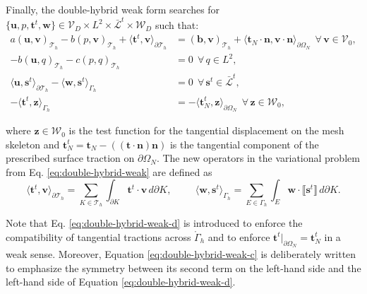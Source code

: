 \documentclass[english,11pt,3p,number,sort&compress]{elsarticle}
\newcommand{\jump}[1]
{
	\llbracket #1 \rrbracket
}
\begin{document}
Finally, the double-hybrid weak form searches for $\{\bm{u},p,\bm{t}^t,\bm{w}\} \in \mathcal{V}_D \times L^2 \times \bar{\mathcal{L}}^t \times \mathcal{W}_D$ such that:
\begin{subequations} \label{eq:double-hybrid-weak}
	\begin{align}
		a\left(\bm{u},\bm{v}\right)_{\mathcal{T}_h} - b\left( p, \bm{v}\right)_{\mathcal{T}_h} +\langle\bm{t}^t,\bm{v}\rangle_{\partial\mathcal{T}_h} &= \left(\bm{b},\bm{v}\right)_{\mathcal{T}_h} + \langle\bm{t}_N\cdot\bm{n},\bm{v}\cdot\bm{n}\rangle_{\partial\Omega_N} ~~\forall\, \bm{v} \in \mathcal{V}_0,\label{eq:double-hybrid-weak-a}\\ 
		-b\left(\bm{u}, q\right)_{\mathcal{T}_h} - c\left(p,q \right)_{\mathcal{T}_h} &= 0 ~~\forall\, q \in L^2, \label{eq:double-hybrid-weak-b}\\
		\langle\bm{u},\bm{s}^t\rangle_{\partial\mathcal{T}_h} - \langle\bm{w},\bm{s}^t\rangle_{\Gamma_h} &= 0 ~~\forall\, \bm{s}^t \in \bar{\mathcal{L}}^t, \label{eq:double-hybrid-weak-c}\\
		-\langle\bm{t}^t,\bm{z}\rangle_{\Gamma_h} &= -\langle\bm{t}_N^t,\bm{z}\rangle_{\partial\Omega_N} ~~\forall\, \bm{z} \in \mathcal{W}_0, \label{eq:double-hybrid-weak-d}
	\end{align}
\end{subequations}

\noindent where $\bm{z} \in \mathcal{W}_0$ is the test function for the tangential displacement on the mesh skeleton and $\bm{t}_N^t= \bm{t}_N - ((\bm{t}\cdot\bm{n})\bm{n})$ is the tangential component of the prescribed surface traction on $\partial\Omega_N$. The new operators in the variational problem from Eq. \eqref{eq:double-hybrid-weak} are defined as 
\begin{equation*}
	\langle\bm{t}^t,\bm{v}\rangle_{\partial\mathcal{T}_h} = \sum_{K \in \mathcal{T}_h} \int_{\partial K} \bm{t}^t \cdot \bm{v} \, d\partial K , \hspace{1cm}
	\langle\bm{w},\bm{s}^t\rangle_{\Gamma_h} = \sum_{E \in \Gamma_h} \int_{E} \bm{w} \cdot \jump{\bm{s}^t} \, d\partial K.
\end{equation*}

Note that Eq. \eqref{eq:double-hybrid-weak-d} is introduced to enforce the compatibility of tangential tractions across $\mathring{\Gamma}_h$ and to enforce $\bm{t}^t\lvert_{\partial\Omega_N}=\bm{t}_N^t$ in a weak sense. Moreover, Equation \eqref{eq:double-hybrid-weak-c} is deliberately written to emphasize the symmetry between its second term on the left-hand side and the left-hand side of Equation \eqref{eq:double-hybrid-weak-d}. 
\end{document}
